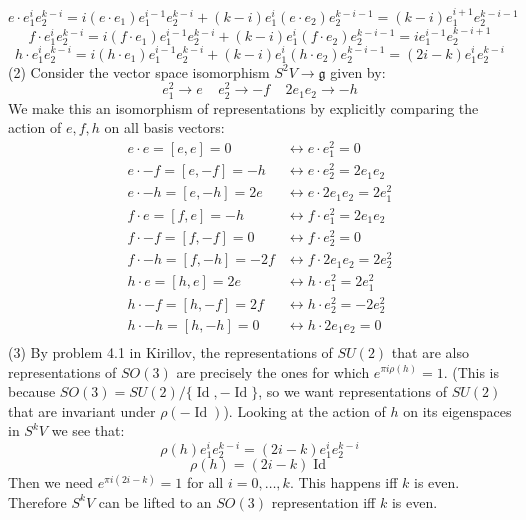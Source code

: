 \documentclass[12 pt]{article}
\DeclareMathOperator{\id}{Id}
\begin{document}
\[         e \cdot e_1^i e_2^{k-i} = i (e \cdot e_1) e_1^{i-1} e_2^{k-i} + (k-i) e_1^i (e \cdot e_2) e_2^{k-i-1}  = (k-i) e_1^{i+1} e_2^{k-i-1}   \]
\[         f \cdot e_1^i e_2^{k-i} = i (f \cdot e_1) e_1^{i-1} e_2^{k-i} + (k-i) e_1^i (f \cdot e_2) e_2^{k-i-1}  = i e_1^{i-1} e_2^{k-i+1}   \]
\[         h \cdot e_1^i e_2^{k-i} = i (h \cdot e_1) e_1^{i-1} e_2^{k-i} + (k-i) e_1^i (h \cdot e_2) e_2^{k-i-1}  = (2i-k) e_1^{i} e_2^{k-i}   \]
(2) Consider the vector space isomorphism $S^2 V \to \mathfrak{g}$ given by:
\[         e_1^2 \to e \;\;\;\; e_2^2 \to -f \;\;\;\; 2e_1e_2 \to -h       \]
We make this an isomorphism of representations by explicitly comparing the action of $e,f,h$ on all basis vectors:
\begin{align*}
e \cdot e = [e,e] = 0 &\longleftrightarrow e\cdot e_1^2 = 0 \\
e \cdot -f = [e,-f] = -h &\longleftrightarrow e\cdot e_2^2 = 2 e_1 e_2 \\
e \cdot -h = [e,-h] = 2e &\longleftrightarrow e\cdot 2e_1 e_2 = 2e_1^2 \\
f \cdot e = [f,e] = -h &\longleftrightarrow f\cdot e_1^2 = 2e_1e_2 \\
f \cdot -f = [f,-f] = 0 &\longleftrightarrow f\cdot e_2^2 = 0 \\
f \cdot -h = [f,-h] = -2f &\longleftrightarrow f\cdot 2e_1 e_2 = 2e_2^2 \\
h \cdot e = [h,e] = 2e &\longleftrightarrow h\cdot e_1^2 = 2 e_1^2 \\
h \cdot -f = [h,-f] = 2f &\longleftrightarrow h\cdot e_2^2 = -2  e_2^2 \\
h \cdot -h = [h,-h] = 0 &\longleftrightarrow h\cdot 2e_1 e_2 = 0 \\
\end{align*}
(3) By problem 4.1 in Kirillov, the representations of $SU(2)$ that are also representations of $SO(3)$ are precisely the ones for which $e^{\pi i \rho(h)} = 1$. (This is because $SO(3) = SU(2) / \{\id, -\id\}$, so we want representations of $SU(2)$ that are invariant under $\rho(-\id)$). Looking at the action of $h$ on its eigenspaces in $S^k V$ we see that:
\[     \rho(h)  e_1^i e_2^{k-i} = (2i-k) e_1^{i} e_2^{k-i}   \]
\[      \rho(h) = (2i-k) \id       \]
Then we need $e^{\pi i (2i-k)} = 1$ for all $i = 0, \dots, k$. This happens iff $k$ is even. Therefore $S^kV$ can be lifted to an $SO(3)$ representation iff $k$ is even.
\end{document}
